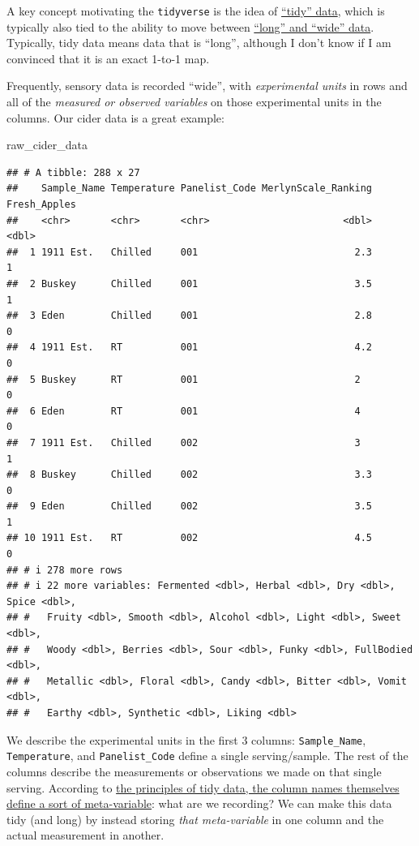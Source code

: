 \documentclass[
]{book}
\newenvironment{Shaded}{\begin{snugshade}}{\end{snugshade}}
\newcommand{\NormalTok}[1]{#1}
\begin{document}
A key concept motivating the \texttt{tidyverse} is the idea of \href{https://r4ds.hadley.nz/data-tidy\#sec-tidy-data}{``tidy'' data}, which is typically also tied to the ability to move between \href{https://datacarpentry.org/r-socialsci/instructor/04-tidyr.html\#reshaping-with-pivot_wider-and-pivot_longer}{``long'' and ``wide'' data}. Typically, tidy data means data that is ``long'', although I don't know if I am convinced that it is an exact 1-to-1 map.

Frequently, sensory data is recorded ``wide'', with \emph{experimental units} in rows and all of the \emph{measured or observed variables} on those experimental units in the columns. Our cider data is a great example:

\begin{Shaded}
\begin{Highlighting}[]
\NormalTok{raw\_cider\_data}
\end{Highlighting}
\end{Shaded}

\begin{verbatim}
## # A tibble: 288 x 27
##    Sample_Name Temperature Panelist_Code MerlynScale_Ranking Fresh_Apples
##    <chr>       <chr>       <chr>                       <dbl>        <dbl>
##  1 1911 Est.   Chilled     001                           2.3            1
##  2 Buskey      Chilled     001                           3.5            1
##  3 Eden        Chilled     001                           2.8            0
##  4 1911 Est.   RT          001                           4.2            0
##  5 Buskey      RT          001                           2              0
##  6 Eden        RT          001                           4              0
##  7 1911 Est.   Chilled     002                           3              1
##  8 Buskey      Chilled     002                           3.3            0
##  9 Eden        Chilled     002                           3.5            1
## 10 1911 Est.   RT          002                           4.5            0
## # i 278 more rows
## # i 22 more variables: Fermented <dbl>, Herbal <dbl>, Dry <dbl>, Spice <dbl>,
## #   Fruity <dbl>, Smooth <dbl>, Alcohol <dbl>, Light <dbl>, Sweet <dbl>,
## #   Woody <dbl>, Berries <dbl>, Sour <dbl>, Funky <dbl>, FullBodied <dbl>,
## #   Metallic <dbl>, Floral <dbl>, Candy <dbl>, Bitter <dbl>, Vomit <dbl>,
## #   Earthy <dbl>, Synthetic <dbl>, Liking <dbl>
\end{verbatim}

We describe the experimental units in the first 3 columns: \texttt{Sample\_Name}, \texttt{Temperature}, and \texttt{Panelist\_Code} define a single serving/sample. The rest of the columns describe the measurements or observations we made on that single serving. According to \href{https://r4ds.hadley.nz/data-tidy\#sec-billboard}{the principles of tidy data, the column names themselves define a sort of meta-variable}: what are we recording? We can make this data tidy (and long) by instead storing \emph{that meta-variable} in one column and the actual measurement in another.
\end{document}
